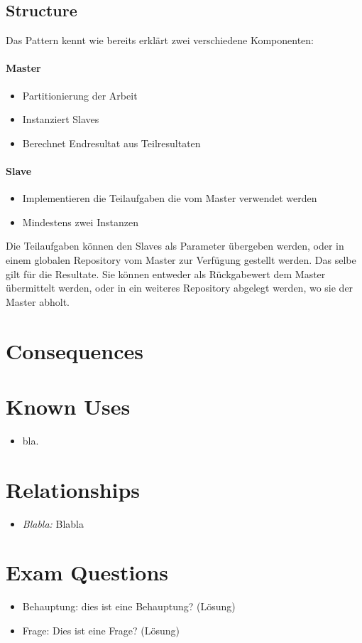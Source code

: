 \subsection{Structure}
Das Pattern kennt wie bereits erklärt zwei verschiedene Komponenten:
\paragraph{Master} 
\begin{itemize}
	\item Partitionierung der Arbeit
	\item Instanziert Slaves
	\item Berechnet Endresultat aus Teilresultaten
\end{itemize}
\paragraph{Slave}
\begin{itemize}
	\item Implementieren die Teilaufgaben die vom Master verwendet werden
	\item Mindestens zwei Instanzen
\end{itemize}
Die Teilaufgaben können den Slaves als Parameter übergeben werden, oder in einem globalen Repository vom Master zur Verfügung gestellt werden. Das selbe gilt für die Resultate. Sie können entweder als Rückgabewert dem Master übermittelt werden, oder in ein weiteres Repository abgelegt werden, wo sie der Master abholt.
\section{Consequences}
\begin{itemize}
\end{itemize}

\section{Known Uses}
\begin{itemize}
	\item bla. 
\end{itemize}

\section{Relationships}
\begin{itemize}
	\item \textit{Blabla:} Blabla

\end{itemize}

\section{Exam Questions}
\begin{itemize}
  	\item Behauptung: dies ist eine Behauptung? (Lösung)
    \item Frage: Dies ist eine Frage? (Lösung)
\end{itemize}
